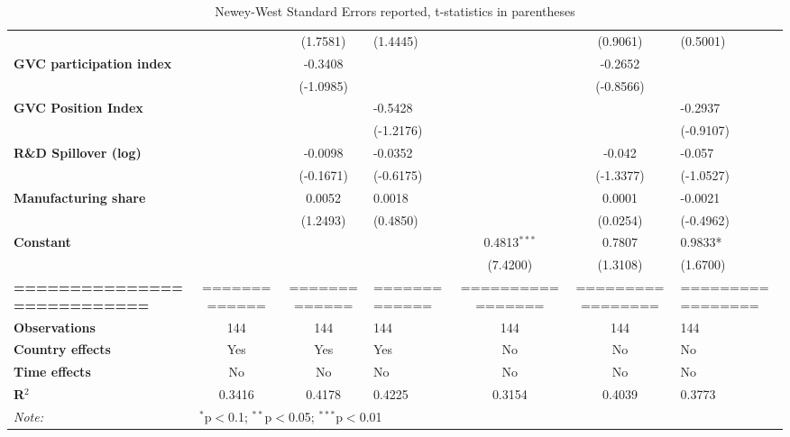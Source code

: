 \documentclass[11pt]{article}
\begin{document}
\begin{table}[!htbp]
\begin{center}
{\begin{tabular}{lcclccl}
\textbf{ }                           &                              &     (1.7581)      &(1.4445)&                   &      (0.9061) &(0.5001)\\
\textbf{GVC participation index}     &                              &     -0.3408       &&                   &      -0.2652        &\\
\textbf{ }                           &                              &    (-1.0985)      &&                   &     (-0.8566) &\\
 \textbf{GVC Position Index}& & & -0.5428& & &-0.2937\\
 & & & (-1.2176)& & &(-0.9107)\\
\textbf{R\&D Spillover (log)}          &                              &     -0.0098       &-0.0352&                   &      -0.042        &-0.057\\
\textbf{ }                           &                              &    (-0.1671)      &(-0.6175)&                   &     (-1.3377)       &(-1.0527)\\
\textbf{Manufacturing share}          &                              &     0.0052       &0.0018&                   &      0.0001        &-0.0021\\
\textbf{ }                           &                              &    (1.2493)      &(0.4850)&                   &     (0.0254) &(-0.4962)\\
\textbf{Constant}                    &                              &                   &&       0.4813$^{***}$      &       0.7807&0.9833*\\
\textbf{ }                           &                              &                   &&      (7.4200)&      (1.3108)       &(1.6700)\\
\textbf{===========================} &        =============         &  =============    &=============    & ================= & =================   &=================   \\
\textbf{Observations}            &             144              &       144         &144&        144        &        144          &144\\
\textbf{Country effects}                 &            Yes           &      Yes       &Yes&    No               &         No          &No\\
\textbf{Time effects}                 &            No           &      No       &No&    No               &         No          &No\\

\textbf{R$^{2}$}  &            0.3416            &      0.4178 &0.4225&       0.3154&       0.4039        &0.3773\\
\bottomrule
\textit{Note:}  & \multicolumn{4}{l}{$^{*}$p$<$0.1; $^{**}$p$<$0.05; $^{***}$p$<$0.01} & & \\ 
\end{tabular}

}
\caption*{\footnotesize Newey-West Standard Errors reported, t-statistics in parentheses}
\end{center}
\end{table}
\end{document}
